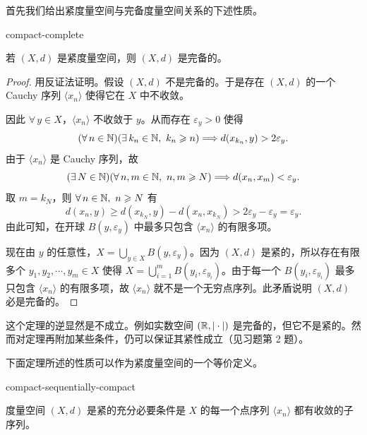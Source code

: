 首先我们给出紧度量空间与完备度量空间关系的下述性质。

\begin{mythm}{}{compact-complete}

若 $(X,d)$ 是紧度量空间，则 $(X,d)$ 是完备的。

\end{mythm}

\begin{proof}

用反证法证明。假设 $(X,d)$ 不是完备的。于是存在 $(X,d)$ 的一个 Cauchy 序列 $\langle x_n\rangle$ 使得它在 $X$ 中不收敛。

因此 $\forall\,y\in X$，$\langle x_n\rangle$ 不收敛于 $y$。从而存在 $\varepsilon_y>0$ 使得
\[(\forall\,n\in\N)(\exists\,k_n\in\N,\ k_n\geqslant n)\Longrightarrow d(x_{k_n},y)>2\varepsilon_y.\]
由于 $\langle x_n\rangle$ 是 Cauchy 序列，故
\[(\exists\,N\in\N)(\forall\,n,m\in\N,\ n,m\geqslant N)\Longrightarrow d(x_n,x_m)<\varepsilon_y.\]
取 $m=k_N$，则 $\forall\,n\in\mathbb{N},\ n\geqslant N$ 有
\[d(x_n,y)\geqslant d(x_{k_N},y)-d(x_n,x_{k_N})>2\varepsilon_y-\varepsilon_y=\varepsilon_y.\]
由此可知，在开球 $B(y,\varepsilon_y)$ 中最多只包含 $\langle x_n\rangle$ 的有限多项。

现在由 $y$ 的任意性，$X=\displaystyle\bigcup_{y\in X}B(y,\varepsilon_y)$。因为 $(X,d)$ 是紧的，所以存在有限多个 $y_1,y_2,\cdots,y_m\in X$ 使得 $X=\displaystyle\bigcup_{i=1}^{m}B(y_i,\varepsilon_{y_i})$。由于每一个 $B(y_i,\varepsilon_{y_i})$ 最多只包含 $\langle x_n\rangle$ 的有限多项，故 $\langle x_n\rangle$ 就不是一个无穷点序列。此矛盾说明 $(X,d)$ 必是完备的。

\end{proof}

这个定理的逆显然是不成立。例如实数空间 $(\mathbb{R},|\cdot|)$ 是完备的，但它不是紧的。然而对定理再附加某些条件，仍可以保证其紧性成立（见习题第 2 题）。

下面定理所述的性质可以作为紧度量空间的一个等价定义。

\begin{mythm}{}{compact-sequentially-compact}

度量空间 $(X,d)$ 是紧的充分必要条件是 $X$ 的每一个点序列 $\langle x_n\rangle$ 都有收敛的子序列。

\end{mythm}

